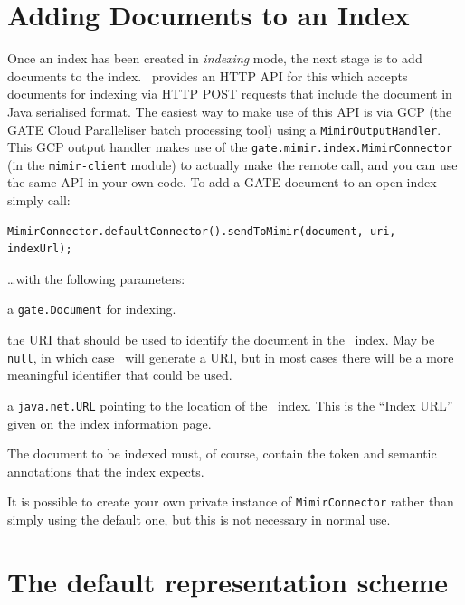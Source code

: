 \section{Adding Documents to an Index}\label{sec:indexing:add-docs}

Once an index has been created in {\em indexing} mode, the next stage is to add
documents to the index.  \Mimir\ provides an HTTP API for this which accepts
documents for indexing via HTTP POST requests that include the document in Java
serialised format.  The easiest way to make use of this API is via GCP (the
GATE Cloud Paralleliser batch processing tool) using a
\lstinline!MimirOutputHandler!.  This GCP output handler makes use of the
\lstinline!gate.mimir.index.MimirConnector! (in the {\tt mimir-client} module)
to actually make the remote call, and you can use the same API in your own
code.  To add a GATE document to an open index simply call:
\begin{lstlisting}[breaklines]
MimirConnector.defaultConnector().sendToMimir(document, uri, indexUrl);
\end{lstlisting}
%
\ldots{}with the following parameters:
\bde
\item[document] a \lstinline!gate.Document! for indexing.
\item[uri] the URI that should be used to identify the document in the \Mimir\
  index.  May be \lstinline!null!, in which case \Mimir\ will generate a URI,
  but in most cases there will be a more meaningful identifier that could be
  used.
\item[indexUrl] a \lstinline!java.net.URL! pointing to the location of the
  \Mimir\ index.  This is the ``Index URL'' given on the index information page.
\ede

The document to be indexed must, of course, contain the token and semantic
annotations that the index expects.

It is possible to create your own private instance of
\lstinline!MimirConnector! rather than simply using the default one, but this
is not necessary in normal use.

\section{The default representation scheme}\label{sec:indexing:dsah-detail}

